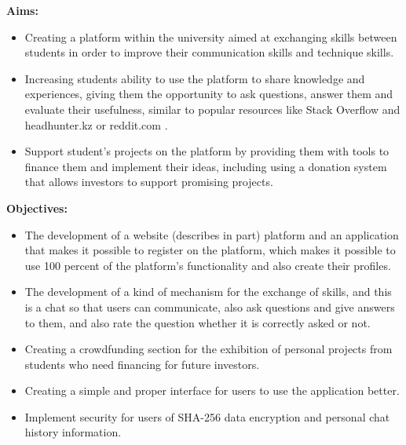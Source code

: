 \par
\flushleft
\textbf{Aims:}
\begin{itemize}
  \item Creating a platform within the university aimed at exchanging skills between students in order to improve their communication skills and technique skills.
  \item Increasing students ability to use the platform to share knowledge and experiences, giving them the opportunity to ask questions, answer them and evaluate their usefulness, similar to popular resources like Stack Overflow \cite{stackoverlow} and headhunter.kz \cite{headhunter} or reddit.com \cite{reddit}.
  \item Support student’s projects on the platform by providing them with tools to finance them and implement their ideas, including using a donation system that allows investors to support promising projects.
\end{itemize}

\textbf{Objectives:}
\begin{itemize}
\par
  \item The development of a website (describes in  part) platform and an application  that makes it possible to register on the platform, which makes it possible to use 100 percent of the platform's functionality and also create their profiles.
  \item The development of a kind of mechanism for the exchange of skills, and this is a chat so that users can communicate, also ask questions and give answers to them, and also rate the question whether it is correctly asked or not.
  \item Creating a crowdfunding \cite{crowdfunding} section for the exhibition of personal projects from students who need financing for future investors.
  \item Creating a simple and proper interface for users to use the application better.
  \item Implement security for users of SHA-256 data encryption and personal chat history information.  
\end{itemize}

\newpage
